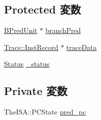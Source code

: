 \subsection*{Protected 変数}
\begin{DoxyCompactItemize}
\item 
\hyperlink{classBPredUnit}{BPredUnit} $\ast$ \hyperlink{classBaseSimpleCPU_adee29d0de843b42df1f1caf92d388413}{branchPred}
\item 
\hyperlink{classTrace_1_1InstRecord}{Trace::InstRecord} $\ast$ \hyperlink{classBaseSimpleCPU_acbcf6d90551f8d3a598a70caae74d1ef}{traceData}
\item 
\hyperlink{classBaseSimpleCPU_a67a0db04d321a74b7e7fcfd3f1a3f70b}{Status} \hyperlink{classBaseSimpleCPU_a6cdf6e6db875a442f3ab6db542bd2bb5}{\_\-status}
\end{DoxyCompactItemize}
\subsection*{Private 変数}
\begin{DoxyCompactItemize}
\item 
TheISA::PCState \hyperlink{classBaseSimpleCPU_a981a27c7fab0ac0f25a26595ab3ded3c}{pred\_\-pc}
\end{DoxyCompactItemize}


